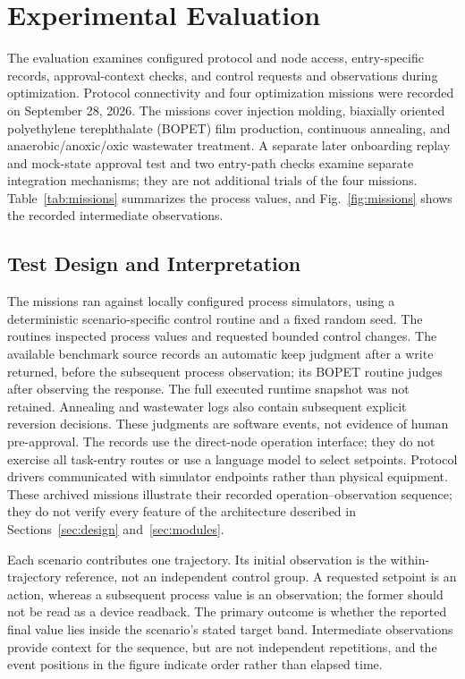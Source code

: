 \section{Experimental Evaluation}
\label{sec:eval}
The evaluation examines configured protocol and node access, entry-specific
records, approval-context checks, and control requests and observations during
optimization. Protocol connectivity and
four optimization missions were recorded on September 28, 2026. The missions
cover injection molding, biaxially oriented polyethylene terephthalate
(BOPET) film production, continuous annealing, and anaerobic/anoxic/oxic
wastewater treatment. A separate later onboarding replay and mock-state
approval test and two entry-path checks examine separate integration mechanisms;
they are not additional trials of the four missions. Table~\ref{tab:missions}
summarizes the process values, and Fig.~\ref{fig:missions} shows the recorded
intermediate observations.

\subsection{Test Design and Interpretation}
\label{sec:eval-protocol}
The missions ran against locally configured process simulators, using a
deterministic scenario-specific control routine and a fixed random seed.
The routines inspected process values and requested bounded control changes.
The available benchmark source records an automatic keep judgment after a
write returned, before the subsequent process observation; its BOPET routine
judges after observing the response. The full executed runtime snapshot was
not retained. Annealing and wastewater logs also contain subsequent explicit
reversion decisions. These judgments are software events, not evidence of
human pre-approval.
The records use the direct-node operation interface; they do not exercise all
task-entry routes or use a language model to select setpoints. Protocol drivers
communicated with simulator endpoints rather than physical equipment.
These archived missions illustrate their recorded operation--observation
sequence; they do not verify every feature of the architecture described in
Sections~\ref{sec:design} and~\ref{sec:modules}.

Each scenario contributes one trajectory. Its initial observation is the
within-trajectory reference, not an independent control group. A requested
setpoint is an action, whereas a subsequent process value is an observation;
the former should not be read as a device readback. The primary outcome is
whether the reported final value lies inside the scenario's stated target
band. Intermediate observations provide context for the sequence, but are
not independent repetitions, and the event positions in the figure indicate
order rather than elapsed time.

